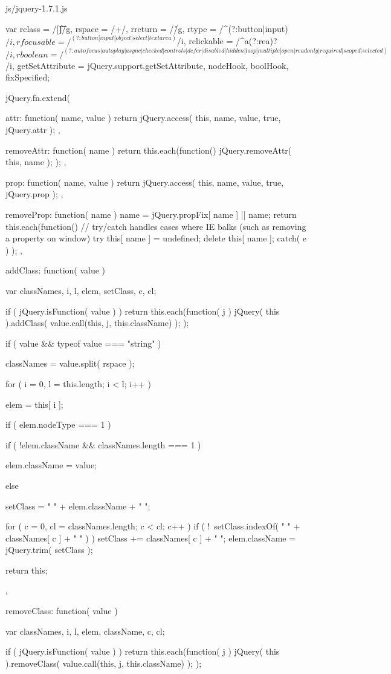 \documentclass{article}
\begin{document}
\begin{chunk}{js/jquery-1.7.1.js}
{var rclass = /[\n\t\r]/g,
	rspace = /\s+/,
	rreturn = /\r/g,
	rtype = /^(?:button|input)$/i,
	rfocusable = /^(?:button|input|object|select|textarea)$/i,
	rclickable = /^a(?:rea)?$/i,
	rboolean = /^(?:autofocus|autoplay|async|checked|controls|defer|disabled|hidden|loop|multiple|open|readonly|required|scoped|selected)$/i,
	getSetAttribute = jQuery.support.getSetAttribute,
	nodeHook, boolHook, fixSpecified;

jQuery.fn.extend({
	attr: function( name, value ) {
		return jQuery.access( this, name, value, true, jQuery.attr );
	},

	removeAttr: function( name ) {
		return this.each(function() {
			jQuery.removeAttr( this, name );
		});
	},

	prop: function( name, value ) {
		return jQuery.access( this, name, value, true, jQuery.prop );
	},

	removeProp: function( name ) {
		name = jQuery.propFix[ name ] || name;
		return this.each(function() {
			// try/catch handles cases where IE balks (such as removing a property on window)
			try {
				this[ name ] = undefined;
				delete this[ name ];
			} catch( e ) {}
		});
	},

	addClass: function( value ) {
		var classNames, i, l, elem,
			setClass, c, cl;

		if ( jQuery.isFunction( value ) ) {
			return this.each(function( j ) {
				jQuery( this ).addClass( value.call(this, j, this.className) );
			});
		}

		if ( value && typeof value === "string" ) {
			classNames = value.split( rspace );

			for ( i = 0, l = this.length; i < l; i++ ) {
				elem = this[ i ];

				if ( elem.nodeType === 1 ) {
					if ( !elem.className && classNames.length === 1 ) {
						elem.className = value;

					} else {
						setClass = " " + elem.className + " ";

						for ( c = 0, cl = classNames.length; c < cl; c++ ) {
							if ( !~setClass.indexOf( " " + classNames[ c ] + " " ) ) {
								setClass += classNames[ c ] + " ";
							}
						}
						elem.className = jQuery.trim( setClass );
					}
				}
			}
		}

		return this;
	},

	removeClass: function( value ) {
		var classNames, i, l, elem, className, c, cl;

		if ( jQuery.isFunction( value ) ) {
			return this.each(function( j ) {
				jQuery( this ).removeClass( value.call(this, j, this.className) );
			});
		}

}}}
\end{chunk}
\end{document}
